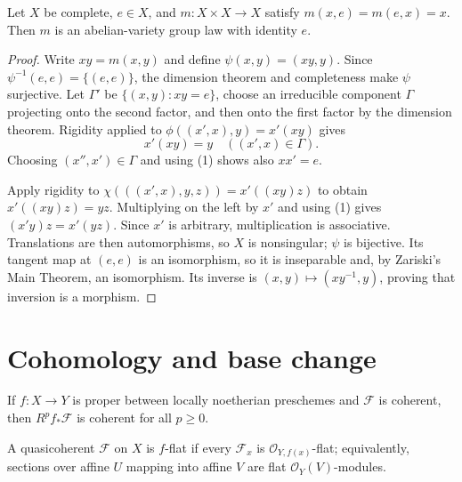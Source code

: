 \begin{theorem}
\label{mumford-thm-unital-composition}
Let $X$ be complete, $e\in X$, and $m:X\times X\to X$ satisfy
$m(x,e)=m(e,x)=x$. Then $m$ is an abelian-variety group law with identity $e$.
\end{theorem}
\begin{proof}
Write $xy=m(x,y)$ and define $\psi(x,y)=(xy,y)$. Since
$\psi^{-1}(e,e)=\{(e,e)\}$, the dimension theorem and completeness make
$\psi$ surjective. Let $\Gamma'$ be $\{(x,y):xy=e\}$, choose an irreducible
component $\Gamma$ projecting onto the second factor, and then onto the first
factor by the dimension theorem. Rigidity applied to
$\phi((x',x),y)=x'(xy)$ gives
\[
 x'(xy)=y\quad((x',x)\in\Gamma).
 \tag{1}
\]
Choosing $(x'',x')\in\Gamma$ and using (1) shows also $xx'=e$.

Apply rigidity to $\chi(((x',x),y,z))=x'((xy)z)$ to obtain
$x'((xy)z)=yz$. Multiplying on the left by $x'$ and using (1) gives
$(x'y)z=x'(yz)$. Since $x'$ is arbitrary, multiplication is associative.
Translations are then automorphisms, so $X$ is nonsingular; $\psi$ is
bijective. Its tangent map at $(e,e)$ is an isomorphism, so it is inseparable
and, by Zariski's Main Theorem, an isomorphism. Its inverse is
$(x,y)\mapsto(xy^{-1},y)$, proving that inversion is a morphism.
\end{proof}

\section{Cohomology and base change}
\label{mumford-source-II5}

\begin{theorem}
\label{mumford-thm-proper-direct-image-coherent}
If $f:X\to Y$ is proper between locally noetherian preschemes and $\mathcal F$
is coherent, then $R^pf_*\mathcal F$ is coherent for all $p\ge0$.
\notready
\end{theorem}

\begin{definition}
\label{mumford-def-f-flat}
A quasicoherent $\mathcal F$ on $X$ is $f$-flat if every $\mathcal F_x$ is
$\mathcal O_{Y,f(x)}$-flat; equivalently, sections over affine $U$ mapping into
affine $V$ are flat $\mathcal O_Y(V)$-modules.
\end{definition}

